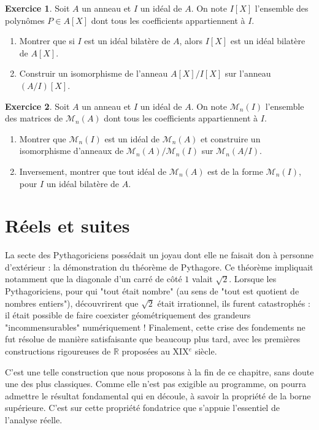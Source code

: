 \documentclass[french]{book}
\newcommand{\R}{\mathbb{R}}
\theoremstyle{plain}
\theoremstyle{definition}
\newtheorem{exe}{Exercice}[chapter]
\theoremstyle{remark}
\begin{document}
\begin{exe}
	Soit $A$ un anneau et $I$ un idéal de $A$. On note $I[X]$ l'ensemble des polynômes $P\in A[X]$ dont tous les coefficients appartiennent à $I$.
	\begin{enumerate}
		\item Montrer que si $I$ est un idéal bilatère de $A$, alors $I[X]$ est un idéal bilatère de $A[X]$.
		\item Construir un isomorphisme de l'anneau $A[X]/I[X]$ sur l'anneau $(A/I)[X]$.
	\end{enumerate}
\end{exe}
\begin{exe}
	Soit $A$ un anneau et $I$ un idéal de $A$. On note $\mathcal{M}_n(I)$ l'ensemble des matrices de $\mathcal{M}_n(A)$ dont tous les coefficients appartiennent à $I$.
	\begin{enumerate}
		\item Montrer que $\mathcal{M}_n(I)$ est un idéal de $\mathcal{M}_n(A)$ et construire un isomorphisme d'anneaux de $\mathcal{M}_n(A)/\mathcal{M}_n(I)$ sur $\mathcal{M}_n(A/I)$.
		\item Inversement, montrer que tout idéal de $\mathcal{M}_n(A)$ est de la forme $\mathcal{M}_n(I)$, pour $I$ un idéal bilatère de $A$.
	\end{enumerate}
\end{exe}

\newpage
\chapter{Réels et suites}
La secte des Pythagoriciens possédait un joyau dont elle ne faisait don à personne d'extérieur : la démonstration du théorème de Pythagore. Ce théorème impliquait notamment que la diagonale d'un carré de côté $1$ valait $\sqrt{2}$. Lorsque les Pythagoriciens, pour qui "tout était nombre" (au sens de "tout est quotient de nombres entiers"), découvrirent que $\sqrt{2}$ était irrationnel, ils furent catastrophés : il était possible de faire coexister géométriquement des grandeurs "incommensurables" numériquement ! Finalement, cette crise des fondements ne fut résolue de manière satisfaisante que beaucoup plus tard, avec les premières constructions rigoureuses de $\R$ proposées au XIX$^e$ siècle. \par C'est une telle construction que nous proposons à la fin de ce chapitre, sans doute une des plus classiques. Comme elle n'est pas exigible au programme, on pourra admettre le résultat fondamental qui en découle, à savoir la propriété de la borne supérieure. C'est sur cette propriété fondatrice que s'appuie l'essentiel de l'analyse réelle.
\end{document}
